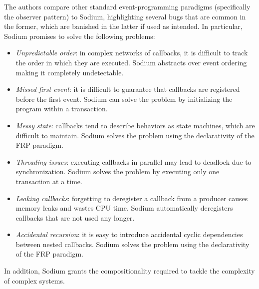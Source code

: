 The authors compare other standard event-programming paradigms (specifically
the observer pattern) to Sodium, highlighting several bugs that are common in
the former, which are banished in the latter if used as intended. In
particular, Sodium promises to solve the following problems:
\begin{itemize}
  \item \textit{Unpredictable order}: in complex networks of callbacks, it is
        difficult to track the order in which they are executed. Sodium
        abstracts over event ordering making it completely undetectable.
  \item \textit{Missed first event}: it is difficult to guarantee that
        callbacks are registered before the first event. Sodium can solve the
        problem by initializing the program within a transaction.
  \item \textit{Messy state}: callbacks tend to describe behaviors as state
        machines, which are difficult to maintain. Sodium solves the problem
        using the declarativity of the \ac{FRP} paradigm.
  \item \textit{Threading issues}: executing callbacks in parallel may lead to
        deadlock due to synchronization. Sodium solves the problem by executing
        only one transaction at a time.
  \item \textit{Leaking callbacks}: forgetting to deregister a callback from
        a producer causes memory leaks and wastes CPU time. Sodium
        automatically deregisters callbacks that are not used any longer.
  \item \textit{Accidental recursion}: it is easy to introduce accidental
        cyclic dependencies between nested callbacks. Sodium solves the problem
        using the declarativity of the \ac{FRP} paradigm.
\end{itemize}
In addition, Sodium grants the compositionality required to tackle the
complexity of complex systems.
